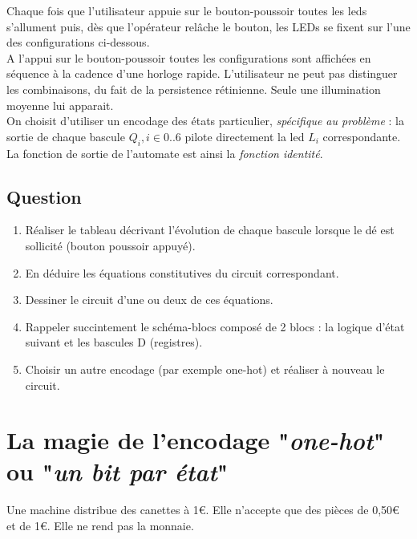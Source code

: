 \documentclass[a4paper,11pt]{article}
\begin{document}
Chaque fois que l'utilisateur appuie sur le bouton-poussoir toutes les leds s'allument puis, dès que l'opérateur relâche le bouton, les LEDs se fixent sur l'une des configurations ci-dessous.\\

A l'appui sur le bouton-poussoir toutes les configurations sont affichées en séquence à la cadence d'une horloge rapide. L'utilisateur ne peut pas distinguer les combinaisons, du fait de la persistence rétinienne. Seule une illumination moyenne lui apparait.\\

On choisit d'utiliser un encodage des états particulier, \textit{spécifique au problème} : la sortie de chaque bascule $Q_i, i\in {0..6}$ pilote directement la led $L_i$ correspondante. La fonction de sortie de l'automate est ainsi la \textit{fonction identité}.

\subsection*{Question}
\begin{enumerate}
\item Réaliser le tableau décrivant l'évolution de chaque bascule lorsque le dé est sollicité (bouton poussoir appuyé).
\item En déduire les équations constitutives du circuit correspondant.
\item Dessiner le circuit d'une ou deux de ces équations.
\item Rappeler succintement le schéma-blocs composé de 2 blocs : la logique d'état suivant et les bascules D (registres).
\item Choisir un autre encodage (par exemple one-hot) et réaliser à nouveau le circuit.
\end{enumerate}



\section{La magie de l'encodage "\textit{one-hot}" ou "\textit{un bit par état}"}

Une machine distribue des canettes à 1€. Elle n'accepte que des pièces de 0,50€ et de 1€. Elle ne rend pas la monnaie.\\
\end{document}
